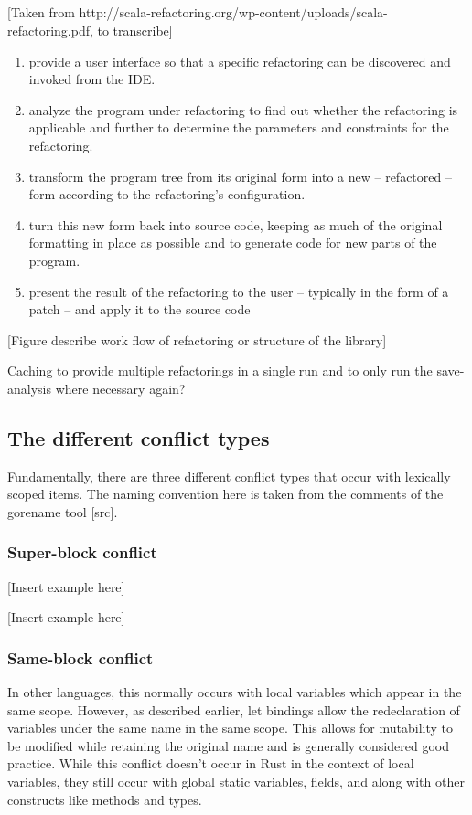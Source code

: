 \subsection{}
[Taken from http://scala-refactoring.org/wp-content/uploads/scala-refactoring.pdf, to transcribe]
\begin{enumerate}
\item provide a user interface so that a specific refactoring can be discovered and
invoked from the IDE.
\item analyze the program under refactoring to find out whether the refactoring is
applicable  and  further  to  determine  the  parameters  and  constraints  for  the
refactoring.
\item transform the program tree from its original form into a new – refactored – form
according to the refactoring’s configuration.
\item turn this new form back into source code,  keeping as much of the original
formatting in place as possible and to generate code for new parts of the program.
\item present the result of the refactoring to the user – typically in the form of a patch –
and apply it to the source code
\end{enumerate}

[Figure describe work flow of refactoring or structure of the library]

Caching to provide multiple refactorings in a single run and to only run the save-analysis where necessary again?

\subsection{The different conflict types}
Fundamentally, there are three different conflict types that occur with lexically scoped items. The naming convention here is taken from the comments of the gorename tool [src].

\subsubsection{Super-block conflict}
[Insert example here]

[Insert example here]

\subsubsection{Same-block conflict}
In other languages, this normally occurs with local variables which appear in the same scope. However, as described earlier, let bindings allow the redeclaration of variables under the same name in the same scope. This allows for mutability to be modified while retaining the original name and is generally considered good practice. While this conflict doesn't occur in Rust in the context of local variables, they still occur with global static variables, fields, and along with other constructs like methods and types.


